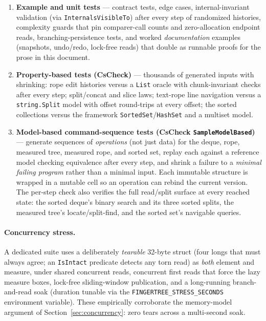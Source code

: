\documentclass[11pt]{article}
\newcommand{\cs}[1]{\lstinline|#1|}
\begin{document}
\begin{enumerate}[leftmargin=1.6em, itemsep=2pt]
  \item \textbf{Example and unit tests} --- contract tests, edge cases, internal-invariant validation
    (via \cs{InternalsVisibleTo}) after every step of randomized histories, complexity guards that pin
    comparer-call counts and zero-allocation endpoint reads, branching-persistence tests, and worked
    \emph{documentation} examples (snapshots, undo/redo, lock-free reads) that double as runnable proofs
    for the prose in this document.
  \item \textbf{Property-based tests (CsCheck)} --- thousands of generated inputs with shrinking: rope
    edit histories versus a \cs{List} oracle with chunk-invariant checks after every step; split/concat
    and slice laws; text-rope line navigation versus a \cs{string.Split} model with offset round-trips at
    every offset; the sorted collections versus the framework \cs{SortedSet}/\cs{HashSet} and a multiset
    model.
  \item \textbf{Model-based command-sequence tests (CsCheck \cs{SampleModelBased})} --- generate
    sequences of \emph{operations} (not just data) for the deque, rope, measured tree, measured rope, and
    sorted set, replay each against a reference model checking equivalence after every step, and shrink a
    failure to a \emph{minimal failing program} rather than a minimal input. Each immutable structure is
    wrapped in a mutable cell so an operation can rebind the current version. The per-step check also
    verifies the full read/split surface at every reached state: the sorted deque's binary search and its
    three sorted splits, the measured tree's locate/split-find, and the sorted set's navigable queries.
\end{enumerate}

\paragraph{Concurrency stress.} A dedicated suite uses a deliberately \emph{tearable} 32-byte struct
(four longs that must always agree; an \cs{IsIntact} predicate detects any torn read) as \emph{both}
element and measure, under shared concurrent reads, concurrent first reads that force the lazy measure
boxes, lock-free sliding-window publication, and a long-running branch-and-read soak (duration tunable via
the \cs{FINGERTREE_STRESS_SECONDS} environment variable). These empirically corroborate the memory-model
argument of Section~\ref{sec:concurrency}: zero tears across a multi-second soak.
\end{document}
